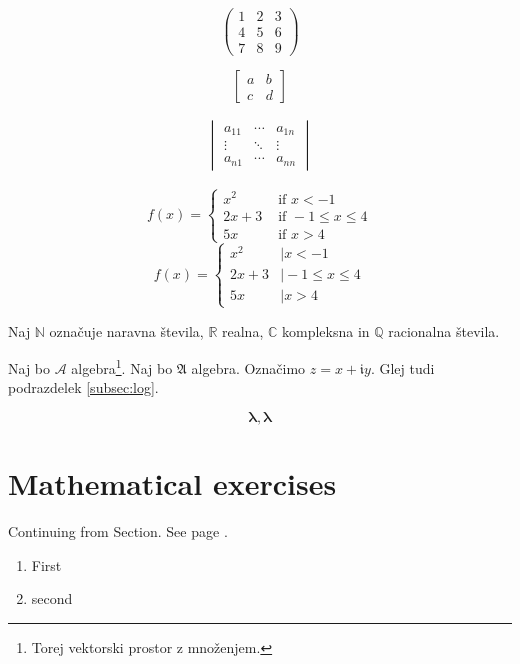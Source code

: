 \documentclass[11pt,a4paper]{article}
\theoremstyle{plain}
\theoremstyle{definition}
\theoremstyle{plain}
\theoremstyle{definition}
\begin{document}
$$
\begin{pmatrix}
	1 & 2 & 3 \\
	4 & 5 & 6 \\
	7 & 8 & 9
\end{pmatrix}
$$

\begin{equation}
	\begin{bmatrix}
		a & b \\
		c & d
	\end{bmatrix}
\end{equation}

\begin{align*}
	\begin{vmatrix}
		a_{11} & \cdots & a_{1n}\\
		\vdots & \ddots & \vdots \\
		a_{n1} & \cdots & a_{nn}
	\end{vmatrix}
\end{align*}

$$
f(x) = 
\begin{cases}
	x^2 & \text{ if } x < -1\\
	2x+3 & \text{ if }  -1 \leq x \leq 4\\
	5x & \text{ if } x > 4
\end{cases}
$$
$$
f(x) = 
\begin{cases}
	x^2 &\mid  x < -1\\
	2x+3  &\mid -1 \leq x \leq 4\\
	5x &\mid  x > 4
\end{cases}
$$


Naj $\mathbb{N}$ označuje naravna števila, $\mathbb{R}$ realna, $\mathbb{C}$ kompleksna in $\mathbb{Q}$ racionalna števila.

Naj bo $\mathcal{A}$ algebra\footnote{Torej vektorski prostor z množenjem.}. Naj bo $\mathfrak{A}$ algebra.
Označimo $z = x + \mathfrak{i} y.$ Glej tudi podrazdelek \ref{subsec:log}.

$$
\mathbf{\lambda}, \boldsymbol{\lambda}
$$

\section{Mathematical exercises}

Continuing from Section. See page \pageref{sec:beg}.

\begin{enumerate}
	\item First
	\item second
\end{enumerate}
\end{document}
